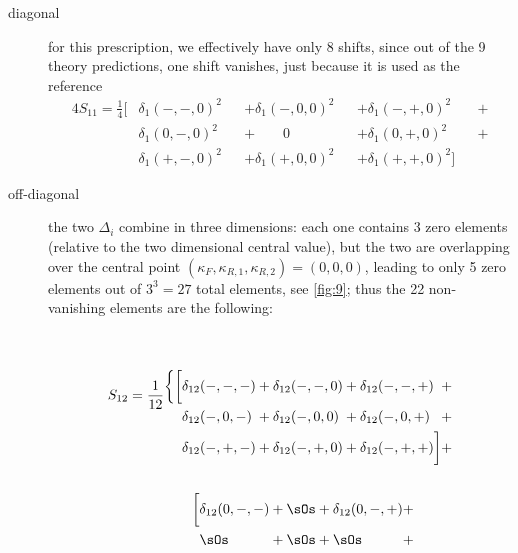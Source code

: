 \begin{description}
    \item[diagonal] for this prescription, we effectively have only 8 shifts,
        since out of the 9 theory predictions, one shift vanishes, just
        because it is used as the reference
        \begin{alignat}{4}
            S_{11} = \frac{1}{4} \bigg[ \nonumber
                &\delta_1(-,-,0)^2 &&+ \delta_1(-,0,0)^2 &&+ \delta_1(-,+,0)^2 &&+\\
                &\delta_1(0,-,0)^2 &&+ \qquad0 &&+ \delta_1(0,+,0)^2 &&+\\
                &\delta_1(+,-,0)^2 &&+ \delta_1(+,0,0)^2 &&+ \delta_1(+,+,0)^2
            \bigg] \nonumber
        \end{alignat}
    \item[off-diagonal] the two $\Delta_i$ combine in three dimensions: each
        one contains 3 zero elements (relative to the two dimensional central
        value), but the two are overlapping over the central point $(\kappa_F,
        \kappa_{R,1}, \kappa_{R,2}) = (0, 0, 0)$, leading to only 5 zero
        elements out of $3^3=27$ total elements, see \cref{fig:9}; thus the 22
        non-vanishing elements are the following:
        \vspace*{-30pt}
        \begin{align}
            S_{12} = \frac{1}{12} &
            \nonumber
            \begin{alignedat}{4}\\\\
                \bigg\{\bigg[
                    &\delta_{12}(-,-,-) &&+ \delta_{12}(-,-,0) &&+ \delta_{12}(-,-,+) &&+\\
                    &\delta_{12}(-,0,-) &&+ \delta_{12}(-,0,0) &&+ \delta_{12}(-,0,+) &&+\\
                    &\delta_{12}(-,+,-) &&+ \delta_{12}(-,+,0) &&+ \delta_{12}(-,+,+) 
            \bigg] &&+\\
        \end{alignedat}\\
        \nonumber\\
                                  &\qquad
                                  \begin{alignedat}{4}
                                      \bigg[
                    &\delta_{12}(0,-,-) &&+ \sOs &&+ \delta_{12}(0,-,+) &&+ \\
                    &\sOs &&+ \sOs &&+ \sOs &&+ \\

\end{alignedat}
\end{align}
\end{description}
